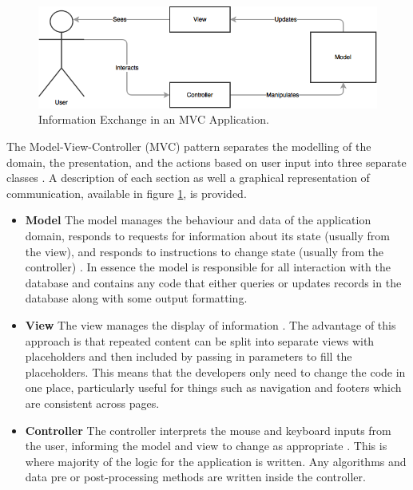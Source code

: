 \begin{figure}[H]
  \centering
  \includegraphics[width=1.0\textwidth]{Images/Research/Technologies/MVC}
  \caption{Information Exchange in an MVC Application.} \label{fig:MVC} 
\end{figure}

The Model-View-Controller (MVC) pattern separates the modelling of the domain, the presentation, and the actions based on user input into three separate classes \cite{MSDN:MVC}. A description of each section as well a graphical representation of communication, available in figure \ref{fig:MVC}, is provided.

\begin{itemize}
	\item \textbf{Model} The model manages the behaviour and data of the application domain, responds to requests for information about its state (usually from the view), and responds to instructions to change state (usually from the controller) \cite{MSDN:MVC}. In essence the model is responsible for all interaction with the database and contains any code that either queries or updates records in the database along with some output formatting.
	\item \textbf{View} The view manages the display of information \cite{MSDN:MVC}. The advantage of this approach is that repeated content can be split into separate views with placeholders and then included by passing in parameters to fill the placeholders. This means that the developers only need to change the code in one place, particularly useful for things such as navigation and footers which are consistent across pages.
	\item \textbf{Controller} The controller interprets the mouse and keyboard inputs from the user, informing the model and view to change as appropriate \cite{MSDN:MVC}. This is where majority of the logic for the application is written. Any algorithms and data pre or post-processing methods are written inside the controller.
\end{itemize}


